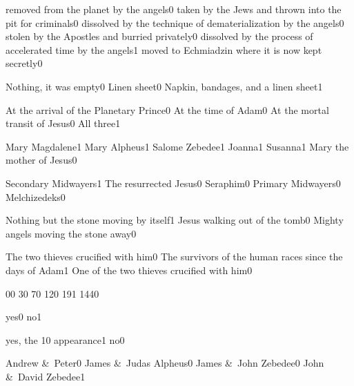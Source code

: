 {removed from the planet by the angels}{0}
{taken by the Jews and thrown into the pit for criminals}{0}
{dissolved by the technique of dematerialization by the angels}{0}
{stolen by the Apostles and burried privately}{0}
{dissolved by the process of accelerated time by the angels}{1}
{moved to Echmiadzin where it is now kept secretly}{0}
\qstop

{Nothing, it was empty}{0}
{Linen sheet}{0}
{Napkin, bandages, and a linen sheet}{1}
\qstop

{At the arrival of the Planetary Prince}{0}
{At the time of Adam}{0}
{At the mortal transit of Jesus}{0}
{All three}{1}
\qstop

{Mary Magdalene}{1}
{Mary Alpheus}{1}
{Salome Zebedee}{1}
{Joanna}{1}
{Susanna}{1}
{Mary the mother of Jesus}{0}
\qstop

{Secondary Midwayers}{1}
{The resurrected Jesus}{0}
{Seraphim}{0}
{Primary Midwayers}{0}
{Melchizedeks}{0}
\qstop

{Nothing but the stone moving by itself}{1}
{Jesus walking out of the tomb}{0}
{Mighty angels moving the stone away}{0}
\qstop

{The two thieves crucified with him}{0}
{The survivors of the human races since the days of Adam}{1}
{One of the two thieves crucified with him}{0}
\qstop


{0}{0}
{3}{0}
{7}{0}
{12}{0}
{19}{1}
{144}{0}
\qstop

{yes}{0}
{no}{1}
\qstop


{yes, the 10 appearance}{1}
{no}{0}
\qstop

{Andrew \&\ Peter}{0}
{James \&\ Judas Alpheus}{0}
{James \&\ John Zebedee}{0}
{John \&\ David Zebedee}{1}
\qstop

